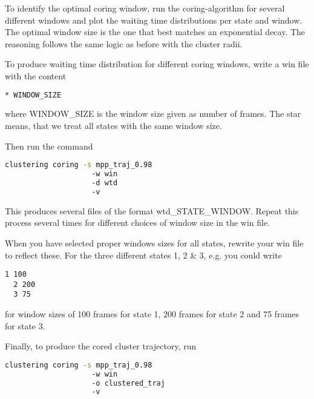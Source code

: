 \documentclass[12pt,a4paper,twoside,english,fleqn]{article}
\begin{document}
To identify the optimal coring window, run the coring-algorithm for several different windows and plot
the waiting time distributions per state and window.
The optimal window size is the one that best matches an exponential decay.
The reasoning follows the same logic as before with the cluster radii.

To produce waiting time distribution for different coring windows, write a {\ttfamily win} file with the content
\begin{lstlisting}[language=bash,basicstyle=\ttfamily]
  * WINDOW_SIZE
\end{lstlisting}
where {\ttfamily WINDOW\_SIZE} is the window size given as number of frames.
The star means, that we treat all states with the same window size.

Then run the command
\begin{lstlisting}[language=bash,basicstyle=\ttfamily]
  clustering coring -s mpp_traj_0.98
                    -w win
                    -d wtd
                    -v
\end{lstlisting}

This produces several files of the format {\ttfamily wtd\_STATE\_WINDOW}.
Repeat this process several times for different choices of window size in the {\ttfamily win} file.

When you have selected proper windows sizes for all states, rewrite your {\ttfamily win} file
to reflect these. For the three different states 1, 2 \& 3, e.g. you could write
\begin{lstlisting}[basicstyle=\ttfamily]
  1 100
  2 200
  3 75
\end{lstlisting}
for window sizes of 100 frames for state 1, 200 frames for state 2 and 75 frames for state 3.

Finally, to produce the cored cluster trajectory, run
\begin{lstlisting}[language=bash,basicstyle=\ttfamily]
  clustering coring -s mpp_traj_0.98
                    -w win
                    -o clustered_traj
                    -v
\end{lstlisting}
\end{document}
